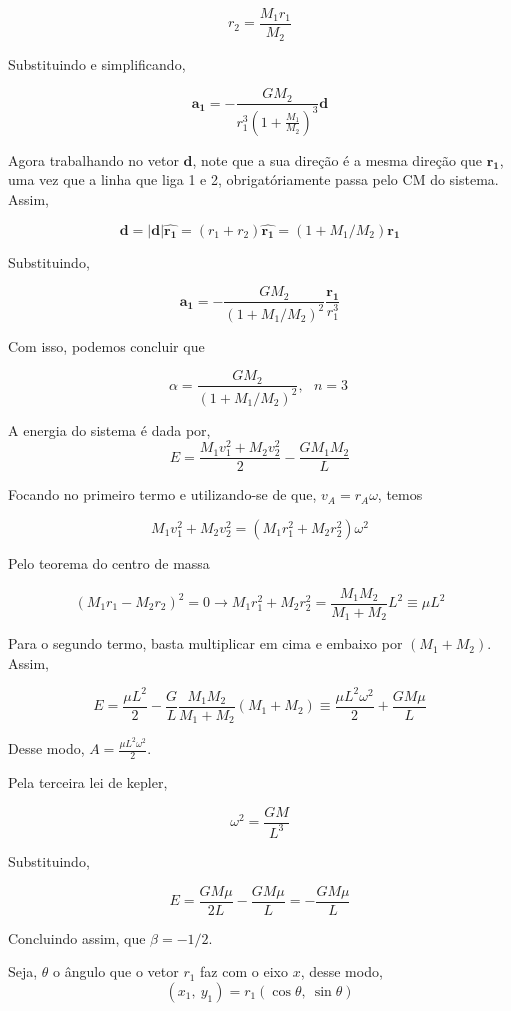 \documentclass[11pt]{article}
\begin{document}
\begin{pproblem}
\begin{pssolution*}{}{}
\begin{alternativas}
        \[r_2 = \frac{M_1r_1}{M_2}\]

        Substituindo e simplificando, 

        \[\mathbf{a_1} = -\frac{GM_2}{r_1^3(1+\frac{M_1}{M_2})^3}\mathbf{d}\]

        Agora trabalhando no vetor \(\mathbf{d}\), note que a sua direção é a mesma direção que \(\mathbf{r_1}\), uma vez que a linha que liga 1 e 2, obrigatóriamente passa pelo CM do sistema. Assim, 

        \[\mathbf{d} = |\mathbf{d}|\hat{\mathbf{r_1}} = (r_1+r_2)\hat{\mathbf{r_1}} = (1+M_1/M_2)\mathbf{r_1}\]

        Substituindo, 

        \[\mathbf{a_1} = -\frac{GM_2}{(1+M_1/M_2)^2}\frac{\mathbf{r_1}}{r_1^3}\]

        Com isso, podemos concluir que 

        \[\boxed{\alpha = \frac{GM_2}{(1+M_1/M_2)^2}, \ \ \ n = 3 \ }\]

        \item A energia do sistema é dada por, 
        \[E = \frac{M_1v_1^2+M_2v_2^2}{2}-\frac{GM_1M_2}{L}\]

        Focando no primeiro termo e utilizando-se de que, \(v_A = r_A\omega\), temos 

        \[M_1v_1^2+M_2v_2^2 = (M_1r_1^2 + M_2r_2^2)\omega^2 \]

        Pelo teorema do centro de massa 

        \[(M_1r_1-M_2r_2)^2=0 \rightarrow M_1r_1^2 +M_2r^2_2 = \frac{M_1M_2}{M_1+M_2}L^2\equiv \mu L^2\]

        Para o segundo termo, basta multiplicar em cima e embaixo por \((M_1+M_2)\). Assim, 

        \[E = \frac{\mu L^2}{2} - \frac{G}{L}\frac{M_1M_2}{M_1+M_2}(M_1+M_2) \equiv \frac{\mu L^2\omega^2}{2} + \frac{GM\mu }{L}\]

        Desse modo, \(\boxed{A = \frac{\mu L^2\omega^2}{2}}\).

        \item Pela terceira lei de kepler, 
        
        \[\omega^2 = \frac{GM}{L^3}\]

        Substituindo, 

        \[E = \frac{GM\mu}{2L} - \frac{GM\mu}{L} = -\frac{GM\mu}{L}\]

        Concluindo assim, que \(\boxed{\beta = -1/2}\).

        \item Seja, \(\theta\) o ângulo que o vetor \(r_1\) faz com o eixo \(x\), desse modo, 
        \[(x_1, \ y_1) = r_1(\cos\theta, \ \sin\theta)\]


\end{alternativas}
\end{pssolution*}
\end{pproblem}
\end{document}
